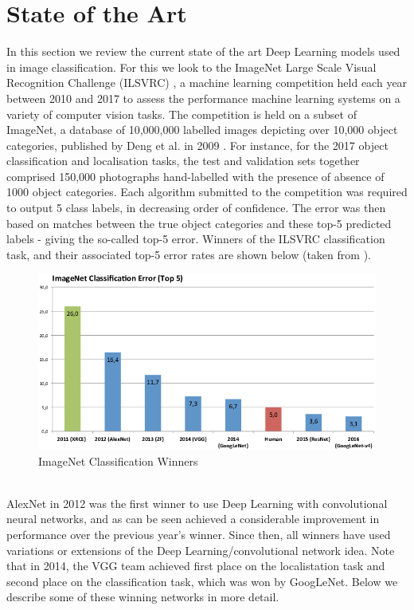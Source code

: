 \documentclass[11pt]{article} %
\theoremstyle{plain}
\theoremstyle{definition}
\begin{document}
\section{State of the Art}
In this section we review the current state of the art Deep Learning models used in image classification. For this we look to the ImageNet Large Scale Visual Recognition Challenge (ILSVRC) \cite{ILSVRC}, a machine learning competition held each year between 2010 and 2017 to assess the performance machine learning systems on a variety of computer vision tasks. The competition is held on a subset of ImageNet, a database of 10,000,000 labelled images depicting over 10,000 object categories, published by Deng et al. in 2009 \cite{imagenet}. For instance, for the 2017 object classification and localisation tasks, the test and validation sets together comprised 150,000 photographs hand-labelled with the presence of absence of 1000 object categories. Each algorithm submitted to the competition was required to output 5 class labels, in decreasing order of confidence. The error was then based on matches between the true object categories and these top-5 predicted labels - giving the so-called top-5 error. Winners of the ILSVRC classification task, and their associated top-5 error rates are shown below (taken from \cite{ILSVRC_Classification_Top5}).          
\begin{figure}[!ht]
  \centering    
  \caption{ImageNet Classification Winners}
  \label{fig:ILSVRC_Winners}
  \includegraphics[scale=0.4]{ILSVRC_Winners.png}
\end{figure}
\\
\noindent
AlexNet in 2012 was the first winner to use Deep Learning with convolutional neural networks, and as can be seen achieved a considerable improvement in performance over the previous year's winner. Since then, all winners have used variations or extensions of the Deep Learning/convolutional network idea. Note that in 2014, the VGG team achieved first place on the localistation task and second place on the classification task, which was won by GoogLeNet. Below we describe some of these winning networks in more detail.
\\
\\
\noindent
\end{document}
